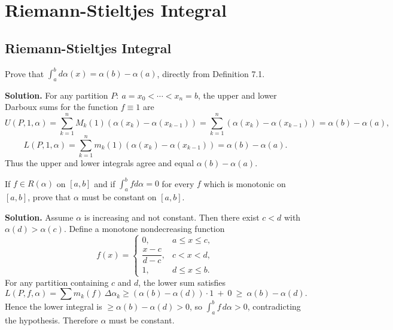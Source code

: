 \chapter{Riemann-Stieltjes Integral}

\section{Riemann-Stieltjes Integral}
\begin{problembox}
Prove that $\int_a^b d\alpha(x) = \alpha(b) - \alpha(a)$, directly from Definition 7.1.
\end{problembox}

\noindent\textbf{Solution.}
For any partition $P:\ a=x_0<\cdots<x_n=b$, the upper and lower Darboux sums for the function $f\equiv 1$ are
\[U(P,1,\alpha)=\sum_{k=1}^n M_k(1)(\alpha(x_k)-\alpha(x_{k-1}))=\sum_{k=1}^n (\alpha(x_k)-\alpha(x_{k-1}))=\alpha(b)-\alpha(a),\]
\[L(P,1,\alpha)=\sum_{k=1}^n m_k(1)(\alpha(x_k)-\alpha(x_{k-1}))=\alpha(b)-\alpha(a).\]
Thus the upper and lower integrals agree and equal $\alpha(b)-\alpha(a)$.
\medskip

\begin{problembox}
If $f \in R(\alpha)$ on $[a, b]$ and if $\int_a^b f d\alpha = 0$ for every $f$ which is monotonic on $[a, b]$, prove that $\alpha$ must be constant on $[a, b]$.
\end{problembox}

\noindent\textbf{Solution.}
Assume $\alpha$ is increasing and not constant. Then there exist $c<d$ with $\alpha(d)>\alpha(c)$. Define a monotone nondecreasing function
\[
f(x)=\begin{cases}
0,& a\le x\le c,\\
\dfrac{x-c}{d-c},& c<x<d,\\
1,& d\le x\le b.
\end{cases}
\]
For any partition containing $c$ and $d$, the lower sum satisfies
\[L(P,f,\alpha)=\sum m_k(f)\,\Delta\alpha_k\ge (\alpha(b)-\alpha(d))\cdot 1\ +\ 0\ \ge\ \alpha(b)-\alpha(d).
\]
Hence the lower integral is $\ge \alpha(b)-\alpha(d)>0$, so $\int_a^b f\,d\alpha>0$, contradicting the hypothesis. Therefore $\alpha$ must be constant.
\medskip

